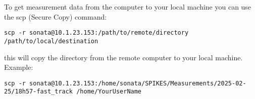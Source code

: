 \documentclass{article}
\begin{document}
To get measurement data from the computer to your local machine you can use the scp (Secure Copy) command:

\begin{lstlisting}
scp -r sonata@10.1.23.153:/path/to/remote/directory /path/to/local/destination
\end{lstlisting}

this will copy the directory from the remote computer to your local machine.\\

Example:

\begin{lstlisting}
scp -r sonata@10.1.23.153:/home/sonata/SPIKES/Measurements/2025-02-25/18h57-fast_track /home/YourUserName
\end{lstlisting}
\end{document}
